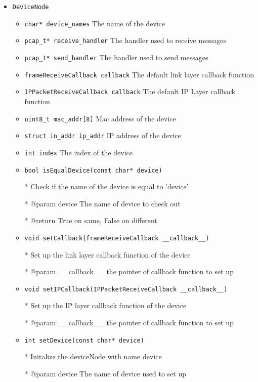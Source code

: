 \documentclass[11pt]{article}
\begin{document}
		\begin{itemize}
			\item \texttt{DeviceNode}
			
			\begin{itemize}
				\item \texttt{char* device\_names} The name of the device 
				\item \texttt{pcap\_t* receive\_handler} The handler used to receive messages
				\item \texttt{pcap\_t* send\_handler} The handler used to send messages
				\item \texttt{frameReceiveCallback callback} The default link layer callback function
				\item \texttt{IPPacketReceiveCallback callback} The default IP Layer callback function
				\item \texttt{uint8\_t mac\_addr[8]} Mac address of the device
				\item \texttt{struct in\_addr ip\_addr} IP address of the device
				\item \texttt{int index} The index of the device
				\item \texttt{bool isEqualDevice(const char* device)}
				
				* Check if the name of the device is equal to 'device'
				
				* @param device The name of device to check out
				
				* @return True on same, False on different
				
				\item \texttt{void setCallback(frameReceiveCallback \_\_callback\_\_)}
				
				* Set up the link layer callback function of the device
				
				* @param \_\_callback\_\_ the pointer of callback function to set up
				
				\item \texttt{void setIPCallback(IPPacketReceiveCallback \_\_callback\_\_)}
				
				* Set up the IP layer callback function of the device
				
				* @param \_\_callback\_\_ the pointer of callback function to set up
				
				\item \texttt{int setDevice(const char* device)}
					
				* Initalize the deviceNode with name device
				
				* @param device The name of device used to set up
				

\end{itemize}
\end{itemize}
\end{document}
